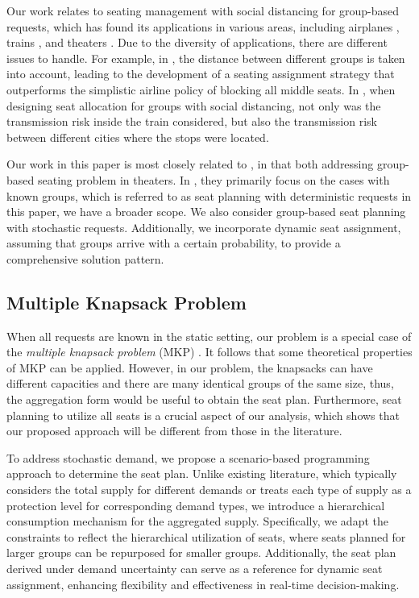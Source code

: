 Our work relates to seating management with social distancing for group-based requests, which has found its applications in various areas, including airplanes \cite{salari2022social}, trains \cite{haque2023social}, and theaters \cite{blom2022filling}. Due to the diversity of applications, there are different issues to handle. For example, in \cite{salari2022social}, the distance between different groups is taken into account, leading to the development of a seating assignment strategy that outperforms the simplistic airline policy of blocking all middle seats. In \cite{haque2023social}, when designing seat allocation for groups with social distancing, not only was the transmission risk inside the train considered, but also the transmission risk between different cities where the stops were located.


Our work in this paper is most closely related to \cite{blom2022filling}, in that both addressing group-based seating problem in theaters. In \cite{blom2022filling}, they primarily focus on the cases with known groups, which is referred to as seat planning with deterministic requests in this paper, we have a broader scope. We also consider group-based seat planning with stochastic requests. Additionally, we incorporate dynamic seat assignment, assuming that groups arrive with a certain probability, to provide a comprehensive solution pattern.


\subsection{Multiple Knapsack Problem}
When all requests are known in the static setting, our problem is a special case of the \textit{multiple knapsack problem} (MKP) \cite{ferreira1996solving, pisinger1999exact}. It follows that some theoretical properties of MKP can be applied. However, in our problem, the knapsacks can have different capacities and there are many identical groups of the same size, thus, the aggregation form would be useful to obtain the seat plan. Furthermore, seat planning to utilize all seats is a crucial aspect of our analysis, which shows that our proposed approach will be different from those in the literature.

To address stochastic demand, we propose a scenario-based programming approach \cite{feng2013scenario, casey2005scenario, henrion2018problem} to determine the seat plan. Unlike existing literature, which typically considers the total supply for different demands or treats each type of supply as a protection level for corresponding demand types, we introduce a hierarchical consumption mechanism for the aggregated supply. Specifically, we adapt the constraints to reflect the hierarchical utilization of seats, where seats planned for larger groups can be repurposed for smaller groups. Additionally, the seat plan derived under demand uncertainty can serve as a reference for dynamic seat assignment, enhancing flexibility and effectiveness in real-time decision-making.


